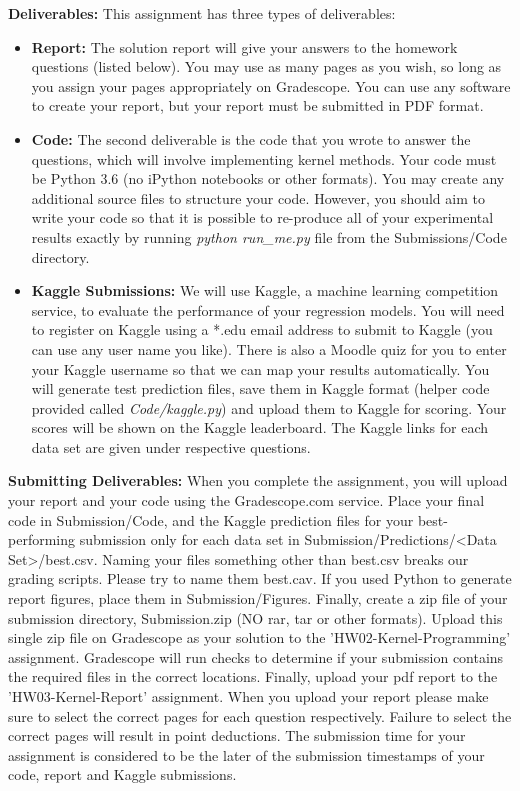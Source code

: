 \documentclass[11pt]{article}
\begin{document}
\vspace{5mm}
\textbf{Deliverables:} This assignment has three types of deliverables:
\begin{itemize}
\item \textbf{Report:} The solution report will give your answers to the homework questions (listed below). You  may use as many pages as you wish, so long as you assign your pages appropriately on Gradescope.  You can use any software to create your report, but your report must be submitted in PDF format. 

\item \textbf{Code:} The second deliverable is the code that you wrote to answer the questions, which will involve implementing kernel methods. Your code must be Python 3.6 (no iPython notebooks or other formats). You may create any additional source files to structure your code. However, you should aim to write your code so that it is possible to re-produce all of your experimental results exactly by running \textit{python run\_me.py} file from the Submissions/Code directory.

\item \textbf{Kaggle Submissions:} We will use Kaggle, a machine learning competition service, to evaluate the performance of your regression models. You will need to register on Kaggle using a *.edu email address to submit to Kaggle (you can use any user name you like). There is also a Moodle quiz for you to enter your Kaggle username so that we can map your results automatically. You will generate test prediction files, save them in Kaggle format (helper code provided called \textit{Code/kaggle.py}) and upload them to Kaggle for scoring. Your scores will be shown on the Kaggle leaderboard.
The Kaggle links for each data set are given under respective questions.

\end{itemize}
\vspace{1em}

\textbf{Submitting Deliverables:}
When you complete the assignment, you will upload your report and your code using the Gradescope.com service. Place your final code in Submission/Code, and the Kaggle prediction files for your best-performing submission only for each data set in Submission/Predictions/<Data Set>/best.csv. Naming your files something other than best.csv breaks our grading scripts. Please try to name them best.cav. If you used Python to generate report figures, place them in Submission/Figures. Finally, create a zip file of your submission directory, Submission.zip (NO rar, tar or other formats). Upload this single zip file on Gradescope as your solution to the 'HW02-Kernel-Programming' assignment. Gradescope will run checks to determine if your submission contains the required files in the correct locations. Finally, upload your pdf report to the 'HW03-Kernel-Report' assignment. When you upload your report please make sure to select the correct pages for each question respectively. Failure to select the correct pages will result in point deductions. The submission time for your assignment is considered to be the later of the submission timestamps of your code, report and Kaggle submissions.\\
\end{document}
